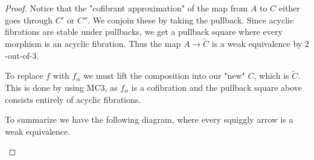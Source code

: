 \documentclass[../thesis.tex]{subfiles}
\begin{document}
\begin{proof}
                Notice that the "cofibrant approximation" of the map from $A$ to $C$ either goes through $C'$ or $C''$. We conjoin these by taking the pullback. Since acyclic fibrations are stable under pullbacks, we get a pullback square where every morphism is an acyclic fibration. Thus the map $A\rightarrow \widetilde{C}$ is a weak equivalence by $2$-out-of-$3$.
                \begin{center}
                \end{center}

                To replace $f$ with $f_\alpha$ we must lift the composition into our "new" $C$, which is $\widetilde{C}$. This is done by using MC3, as $f_\alpha$ is a cofibration and the pullback square above consists entirely of acyclic fibrations.
                \begin{center}
                \end{center}

                To summarize we have the following diagram, where every squiggly arrow is a weak equivalence.
                \begin{center}
                \end{center}


\end{proof}
\end{document}
